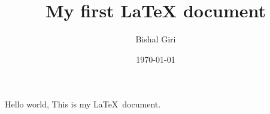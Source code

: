 \documentclass[12pt,a4paper]{article}
\title{My first LaTeX document}
\author{Bishal Giri}
\date{\today}
\begin{document}
\maketitle
Hello world, This is my \LaTeX\ document.
\end{document}
